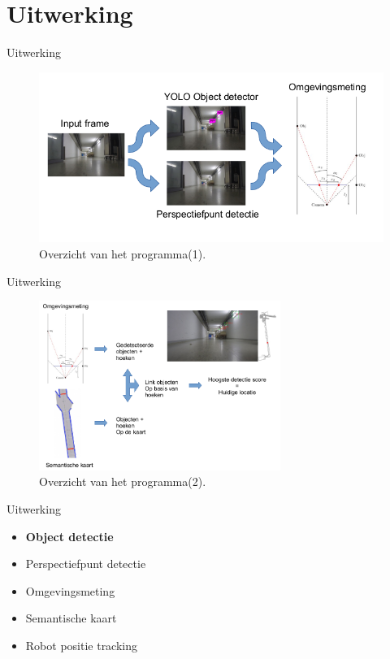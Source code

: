 \documentclass[11pt,t]{beamer}
\begin{document}
\section{Uitwerking}
\begin{frame}[fragile]{Uitwerking}
	\begin{figure}
		\centering
		\includegraphics[width=\textwidth]{graphics/pipeline1.png}
		\caption{Overzicht van het programma(1).}
	\end{figure}
\end{frame}
\begin{frame}[fragile]{Uitwerking}
	\begin{figure}
		\centering
		\includegraphics[width=0.7\textwidth]{graphics/pipeline2.png}
		\caption{Overzicht van het programma(2).}
	\end{figure}
\end{frame}

\begin{frame}[fragile]{Uitwerking}
	\begin{itemize}
		\item \textbf{Object detectie}
		\item Perspectiefpunt detectie
		\item Omgevingsmeting
		\item Semantische kaart
		\item Robot positie tracking
	\end{itemize}
\end{frame}
\end{document}
